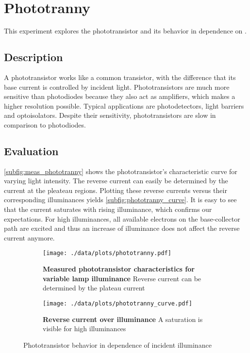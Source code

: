 \chapter{Phototranny}
This experiment explores the phototransistor and its behavior in dependence on .

\section{Description}
A phototransistor works like a common transistor, with the difference that its base current is controlled by incident light.
Phototransistors are much more sensitive than photodiodes because they also act as amplifiers, which makes a higher resolution possible.
Typical applications are photodetectors, light barriers and optoisolators.
Despite their sensitivity, phototransistors are slow in comparison to photodiodes.

\section{Evaluation}
\autoref{subfig:meas_phototranny} shows the phototransistor's characteristic curve for varying light intensity.
The reverse current can easily be determined by the current at the pleateau regions.
Plotting these reverse currents versus their corresponding illuminances yields \autoref{subfig:phototranny_curve}.
It is easy to see that the current saturates with rising illuminance, which confirms our expectations.
For high illuminances, all available electrons on the base-collector path are excited and thus an increase of illuminance does not affect the reverse current anymore.
\begin{figure}[btp]
	\centering
	\begin{subfigure}{0.4\textwidth}
		\centering
		\texttt{[image: ./data/plots/phototranny.pdf]}
		\caption[Measured phototransistor characteristics for variable lamp illuminance]{\textbf{Measured phototransistor characteristics for variable lamp illuminance} Reverse current can be determined by the plateau current}
		\label{subfig:meas_phototranny}
	\end{subfigure}\quad
	\begin{subfigure}{0.4\textwidth}
		\centering
		\texttt{[image: ./data/plots/phototranny\_curve.pdf]}
		\caption[Reverse current over illuminance]{\textbf{Reverse current over illuminance} A saturation is visible for high illuminances}
		\label{subfig:phototranny_curve}
	\end{subfigure}
	\caption{Phototransistor behavior in dependence of incident illuminance}
\end{figure}

